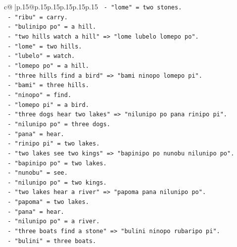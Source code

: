 \documentclass{article}
\begin{document}
{\begin{supertabular}{c@{$\;$}|p{.15\linewidth}@{}p{.15\linewidth}p{.15\linewidth}p{.15\linewidth}p{.15\linewidth}p{.15\linewidth}}
{{{\texttt{                     {-} "lome" = two stones.} \\
\texttt{                     {-} "ribu" = carry.} \\
\texttt{                     {-} "bulinipo po" = a hill.} \\
\texttt{                   {-} "two hills watch a hill" => "lome lubelo lomepo po".} \\
\texttt{                     {-} "lome" = two hills.} \\
\texttt{                     {-} "lubelo" = watch.} \\
\texttt{                     {-} "lomepo po" = a hill.} \\
\texttt{                   {-} "three hills find a bird" => "bami ninopo lomepo pi".} \\
\texttt{                     {-} "bami" = three hills.} \\
\texttt{                     {-} "ninopo" = find.} \\
\texttt{                     {-} "lomepo pi" = a bird.} \\
\texttt{                   {-} "three dogs hear two lakes" => "nilunipo po pana rinipo pi".} \\
\texttt{                     {-} "nilunipo po" = three dogs.} \\
\texttt{                     {-} "pana" = hear.} \\
\texttt{                     {-} "rinipo pi" = two lakes.} \\
\texttt{                   {-} "two lakes see two kings" => "bapinipo po nunobu nilunipo po".} \\
\texttt{                     {-} "bapinipo po" = two lakes.} \\
\texttt{                     {-} "nunobu" = see.} \\
\texttt{                     {-} "nilunipo po" = two kings.} \\
\texttt{                   {-} "two lakes hear a river" => "papoma pana nilunipo po".} \\
\texttt{                     {-} "papoma" = two lakes.} \\
\texttt{                     {-} "pana" = hear.} \\
\texttt{                     {-} "nilunipo po" = a river.} \\
\texttt{                   {-} "three boats find a stone" => "bulini ninopo rubaripo pi".} \\
\texttt{                     {-} "bulini" = three boats.} \\
}}}
\end{supertabular}}
\end{document}
